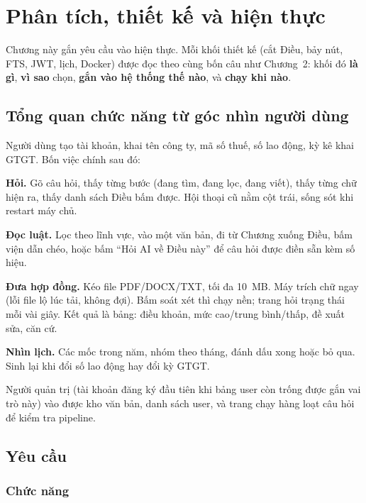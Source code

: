 \chapter{Phân tích, thiết kế và hiện thực}

Chương này gắn yêu cầu vào hiện thực. Mỗi khối thiết kế (cắt Điều, bảy nút,
FTS, JWT, lịch, Docker) được đọc theo cùng bốn câu như Chương~2: khối đó
\textbf{là gì}, \textbf{vì sao} chọn, \textbf{gắn vào hệ thống thế nào}, và
\textbf{chạy khi nào}.

\section{Tổng quan chức năng từ góc nhìn người dùng}

Người dùng tạo tài khoản, khai tên công ty, mã số thuế, số lao động, kỳ kê
khai GTGT. Bốn việc chính sau đó:

\textbf{Hỏi.} Gõ câu hỏi, thấy từng bước (đang tìm, đang lọc, đang viết), thấy
từng chữ hiện ra, thấy danh sách Điều bấm được. Hội thoại cũ nằm cột trái, sống
sót khi restart máy chủ.

\textbf{Đọc luật.} Lọc theo lĩnh vực, vào một văn bản, đi từ Chương xuống Điều,
bấm viện dẫn chéo, hoặc bấm ``Hỏi AI về Điều này'' để câu hỏi được điền sẵn
kèm số hiệu.

\textbf{Đưa hợp đồng.} Kéo file PDF/DOCX/TXT, tối đa 10~MB. Máy trích chữ ngay
(lỗi file lộ lúc tải, không đợi). Bấm soát xét thì chạy nền; trang hỏi trạng
thái mỗi vài giây. Kết quả là bảng: điều khoản, mức cao/trung bình/thấp, đề
xuất sửa, căn cứ.

\textbf{Nhìn lịch.} Các mốc trong năm, nhóm theo tháng, đánh dấu xong hoặc bỏ
qua. Sinh lại khi đổi số lao động hay đổi kỳ GTGT.

Người quản trị (tài khoản đăng ký đầu tiên khi bảng user còn trống được gắn vai
trò này) vào được kho văn bản, danh sách user, và trang chạy hàng loạt câu hỏi
để kiểm tra pipeline.

\section{Yêu cầu}

\subsection{Chức năng}

